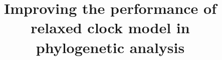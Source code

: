 \documentclass{bmcart}
\begin{document}
\begin{frontmatter}
\begin{fmbox}

\title{Improving the performance of relaxed clock model in phylogenetic analysis}

\author[
]{\inits{} }
\author[
   addressref={aff1},
   corref={aff1},                       %
   email={alexei@cs.auckland.ac.nz}   %
]{\inits{} }

\address[id=aff1]{%
  , %
  ,                     %
  ,                              %
}



\end{fmbox}%


\end{frontmatter}
\end{document}
